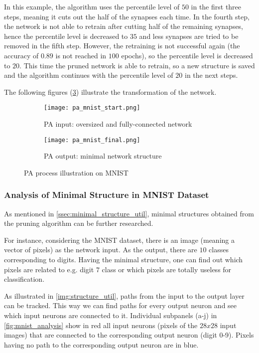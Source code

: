 In this example, the algorithm uses the percentile level of $ 50 $ in the first three steps, meaning it cuts out the half of the synapses each time. In the fourth step, the network is not able to retrain after cutting half of the remaining synapses, hence the percentile level is decreased to $ 35 $ and less synapses are tried to be removed in the fifth step. However, the retraining is not successful again (the accuracy of $ 0.89 $ is not reached in $ 100 $ epochs), so the percentile level is decreased to $ 20 $. This time the pruned network is able to retrain, so a new structure is saved and the algorithm continues with the percentile level of $ 20 $ in the next steps.

The following figures (\ref{img:pa_mnist_morph}) illustrate the transformation of the network.
\begin{figure}[H]
\centering
\begin{subfigure}{0.4\textwidth}
  \centering
  \texttt{[image: pa\_mnist\_start.png]}
  \caption{PA input: oversized and fully-connected network}
  \label{img:pa_mnist_start}
\end{subfigure}%
\begin{subfigure}{0.4\textwidth}
  \centering
  \texttt{[image: pa\_mnist\_final.png]}
  \caption{PA output: minimal network structure}
  \label{img:pa_mnist_final}
\end{subfigure}
\caption{PA process illustration on MNIST}
\label{img:pa_mnist_morph}
\end{figure}

\subsubsection{Analysis of Minimal Structure in MNIST Dataset} \label{sssec:mnist_analysis}
As mentioned in \cref{ssec:minimal_structure_util}, minimal structures obtained from the pruning algorithm can be further researched.

For instance, considering the MNIST dataset, there is an image (meaning a vector of pixels) as the network input. As the output, there are $ 10 $ classes corresponding to digits. Having the minimal structure, one can find out which pixels are related to e.g. digit $ 7 $ class or which pixels are totally useless for classification.

As illustrated in \cref{img:structure_util}, paths from the input to the output layer can be tracked. This way we can find paths for every output neuron and see which input neurons are connected to it. Individual subpanels (a-j) in \cref{fig:mnist_analysis} show in red all input neurons (pixels of the $ 28x28 $ input images) that are connected to the corresponding output neuron (digit 0-9). Pixels having no path to the corresponding output neuron are in blue.

